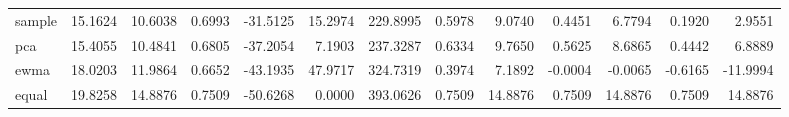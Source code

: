 \begin{tabular}{lrrrrrrrrrrrr}
sample & 15.1624 & 10.6038 & 0.6993 & -31.5125 & 15.2974 & 229.8995 & 0.5978 & 9.0740 & 0.4451 & 6.7794 & 0.1920 & 2.9551 \\
pca & 15.4055 & 10.4841 & 0.6805 & -37.2054 & 7.1903 & 237.3287 & 0.6334 & 9.7650 & 0.5625 & 8.6865 & 0.4442 & 6.8889 \\
ewma & 18.0203 & 11.9864 & 0.6652 & -43.1935 & 47.9717 & 324.7319 & 0.3974 & 7.1892 & -0.0004 & -0.0065 & -0.6165 & -11.9994 \\
equal & 19.8258 & 14.8876 & 0.7509 & -50.6268 & 0.0000 & 393.0626 & 0.7509 & 14.8876 & 0.7509 & 14.8876 & 0.7509 & 14.8876 \\
\bottomrule
\end{tabular}
